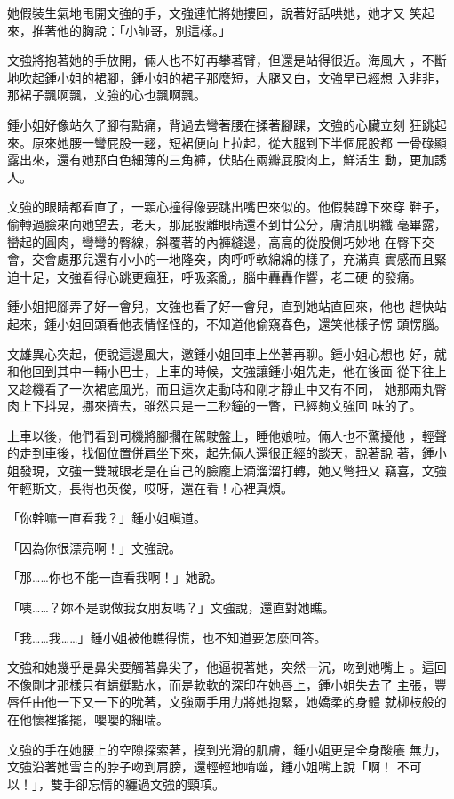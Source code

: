 她假裝生氣地甩開文強的手，文強連忙將她摟回，說著好話哄她，她才又
笑起來，推著他的胸說：「小帥哥，別這樣。」

文強將抱著她的手放開，倆人也不好再攀著臂，但還是站得很近。海風大
，不斷地吹起鍾小姐的裙腳，鍾小姐的裙子那麼短，大腿又白，文強早已經想
入非非，那裙子飄啊飄，文強的心也飄啊飄。

鍾小姐好像站久了腳有點痛，背過去彎著腰在揉著腳踝，文強的心臟立刻
狂跳起來。原來她腰一彎屁股一翹，短裙便向上拉起，從大腿到下半個屁股都
一骨碌顯露出來，還有她那白色細薄的三角褲，伏貼在兩瓣屁股肉上，鮮活生
動，更加誘人。

文強的眼睛都看直了，一顆心撞得像要跳出嘴巴來似的。他假裝蹲下來穿
鞋子，偷轉過臉來向她望去，老天，那屁股離眼睛還不到廿公分，膚清肌明纖
毫畢露，巒起的圓肉，彎彎的臀線，斜覆著的內褲縫邊，高高的從股側巧妙地
在臀下交會，交會處那兒還有小小的一地隆突，肉呼呼軟綿綿的樣子，充滿真
實感而且緊迫十足，文強看得心跳更瘋狂，呼吸紊亂，腦中轟轟作響，老二硬
的發痛。

鍾小姐把腳弄了好一會兒，文強也看了好一會兒，直到她站直回來，他也
趕快站起來，鍾小姐回頭看他表情怪怪的，不知道他偷窺春色，還笑他樣子愣
頭愣腦。

文雄異心突起，便說這邊風大，邀鍾小姐回車上坐著再聊。鍾小姐心想也
好，就和他回到其中一輛小巴士，上車的時候，文強讓鍾小姐先走，他在後面
從下往上又趁機看了一次裙底風光，而且這次走動時和剛才靜止中又有不同，
她那兩丸臀肉上下抖晃，挪來擠去，雖然只是一二秒鐘的一瞥，已經夠文強回
味的了。

上車以後，他們看到司機將腳擱在駕駛盤上，睡他娘啦。倆人也不驚擾他
，輕聲的走到車後，找個位置併肩坐下來，起先倆人還很正經的談天，說著說
著，鍾小姐發現，文強一雙賊眼老是在自己的臉龐上滴溜溜打轉，她又彆扭又
竊喜，文強年輕斯文，長得也英俊，哎呀，還在看！心裡真煩。

「你幹嘛一直看我？」鍾小姐嗔道。

「因為你很漂亮啊！」文強說。

「那……你也不能一直看我啊！」她說。

「咦……？妳不是說做我女朋友嗎？」文強說，還直對她瞧。

「我……我……」鍾小姐被他瞧得慌，也不知道要怎麼回答。

文強和她幾乎是鼻尖要觸著鼻尖了，他逼視著她，突然一沉，吻到她嘴上
。這回不像剛才那樣只有蜻蜓點水，而是軟軟的深印在她唇上，鍾小姐失去了
主張，豐唇任由他一下又一下的吮著，文強兩手用力將她抱緊，她嬌柔的身體
就柳枝般的在他懷裡搖擺，嚶嚶的細喘。

文強的手在她腰上的空隙探索著，摸到光滑的肌膚，鍾小姐更是全身酸癢
無力，文強沿著她雪白的脖子吻到肩膀，還輕輕地啃噬，鍾小姐嘴上說「啊！
不可以！」，雙手卻忘情的纏過文強的頸項。

